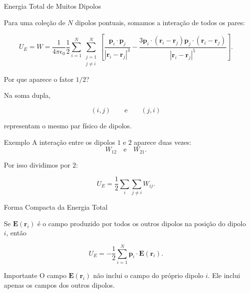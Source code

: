 \documentclass[aspectratio=169]{beamer}
\begin{document}
\begin{frame}{Energia Total de Muitos Dipolos}

Para uma coleção de \(N\) dipolos pontuais, somamos a interação de todos os pares:

\begin{eqbox}
\begin{equation}
U_E
=
W
=
\frac{1}{4\pi\epsilon_0}
\frac{1}{2}
\sum_{i=1}^{N}
\sum_{\substack{j=1 \\ j\neq i}}^{N}
\left[
\frac{\mathbf p_i\cdot \mathbf p_j}{|\mathbf r_i-\mathbf r_j|^3}
-
\frac{
3\mathbf p_i\cdot(\mathbf r_i-\mathbf r_j)
\mathbf p_j\cdot(\mathbf r_i-\mathbf r_j)
}
{|\mathbf r_i-\mathbf r_j|^5}
\right].
\tag{4.31}
\label{eq:4.31}
\end{equation}
\end{eqbox}

\end{frame}

\begin{frame}{Por que aparece o fator \(1/2\)?}

Na soma dupla,

\[
(i,j)
\qquad \text{e} \qquad
(j,i)
\]

representam o mesmo par físico de dipolos.

\begin{mybox}{Exemplo}
A interação entre os dipolos \(1\) e \(2\) aparece duas vezes:
\[
W_{12}
\quad \text{e} \quad
W_{21}.
\]
\end{mybox}

Por isso dividimos por \(2\):

\begin{equation}
U_E
=
\frac{1}{2}
\sum_{i}
\sum_{j\neq i}
W_{ij}.
\end{equation}

\end{frame}

\begin{frame}{Forma Compacta da Energia Total}

Se \(\mathbf E(\mathbf r_i)\) é o campo produzido por todos os outros dipolos
na posição do dipolo \(i\), então

\begin{eqbox}
\begin{equation}
U_E
=
-\frac{1}{2}
\sum_{i=1}^{N}
\mathbf p_i\cdot \mathbf E(\mathbf r_i).
\tag{4.32}
\label{eq:4.32}
\end{equation}
\end{eqbox}

\begin{mybox}{Importante}
O campo \(\mathbf E(\mathbf r_i)\) não inclui o campo do próprio dipolo \(i\).
Ele inclui apenas os campos dos outros dipolos.
\end{mybox}

\end{frame}
\end{document}
